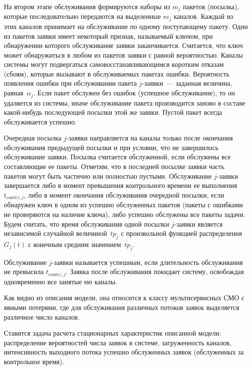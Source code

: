 \begin{multicols}{2}
На втором этапе обслуживания формируются наборы из $m_j$ пакетов 
(посылка), которые последовательно передаются на выделенные $m_j$ каналов. 
Каждый из этих каналов принимает на обслуживание по одному поступающему 
пакету. Один из пакетов заявки имеет некоторый признак, называемый ключом, 
при обнаружении которого обслуживание заявки заканчивается. Считается, что 
ключ может обнаружиться в любом из пакетов заявки с равной вероятностью. 
Каналы сис\-те\-мы могут подвергаться самовосстанавливающимся коротким 
отказам (сбоям), которые вызывают в обслуживаемых пакетах ошибки. 
Вероятность появления ошибки при обслуживании пакета $j$-за\-яв\-ки~--- 
заданная величина, равная~$\alpha_j$. Если пакет обслужен без ошибок 
(успешное обслуживание), то он удаляется из сис\-те\-мы, иначе обслуживание 
пакета производится заново в составе какой-нибудь последующей посылки 
этой же заявки. Пустой пакет всегда обслуживается успешно.

Очередная посылка $j$-заявки направляется на каналы только после окончания 
обслуживания предыду\-щей посылки и при условии, что не завершилось 
обслуживание заявки. Посылка считается обслуженной, если обслужены все 
составляющие ее пакеты. Отметим, что в последней посылке заявки часть 
пакетов могут быть частично или полностью пустыми. Обслуживание 
$j$-за\-яв\-ки завершается либо в момент превышения контрольного времени ее 
выполнения $t_{\mathrm{contr}z,j}$, либо в момент окончания обслуживания очередной 
посылки, если обнаружен ключ в одном из успешно обслуженных пакетов 
(пакеты с ошибками не проверяются на наличие ключа), либо успешно 
обслужены все пакеты задачи. Будем считать, что время обслуживания одной 
посылки $j$-заявки является независимой случайной величиной~$tp_j$ с 
произвольной функцией распределения~$G_j(t)$ с конечным средним 
значением~$\overline{tp}_j$. 

Обслуживание $j$-заявки называется успешным, если длительность 
обслуживания не превысила $t_{\mathrm{contr}z,j}$. Заявка после обслуживания 
покидает сис\-те\-му, освобождая одновременно все занятые ею каналы.

Как видно из описания модели, она относится к классу мультисервисных СМО 
с явными потерями, где для обслуживания различных потоков заявок 
выделяется различное число каналов.
   
   Ставится задача расчета стационарных характеристик описанной модели: 
распределение вероятностей числа заявок в сис\-те\-ме, загруженность каналов, 
интенсивность выходного потока успешно обслуженных заявок (обслуженных 
за контрольное время).
   

\end{multicols}
